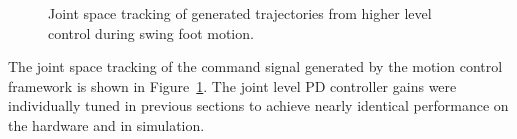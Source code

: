 \begin{figure}[!t]
	\begin{center}
	\end{center}
  	\caption{Joint space tracking of generated trajectories from higher level control during swing foot motion.}
	\label{fig:swingfootq}
\end{figure} 

The joint space tracking of the command signal generated by the motion control framework is shown in Figure~\ref{fig:swingfootq}. The joint level PD controller gains were individually tuned in previous sections to achieve nearly identical performance on the hardware and in simulation. 

